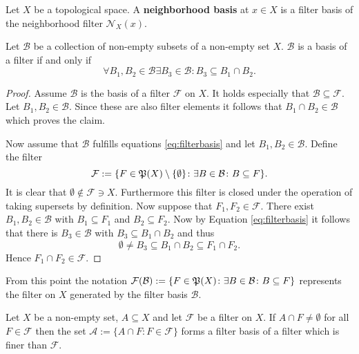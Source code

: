 \begin{defin}\label{defin:nbs}
  Let $X$ be a topological space. A \textbf{neighborhood basis} at $x \in X$ is a filter basis of the neighborhood filter $\mathcal{N}_X(x)$.
\end{defin}
  
\begin{lemma}\label{lem:filbas}
  Let $\mathcal{B}$ be a collection of non-empty subsets of a non-empty set $X$. $\mathcal{B}$ is a basis of a filter if and only if
  \begin{equation}\label{eq:filterbasis}
    \forall B_1, B_2 \in \mathcal{B}\exists B_3 \in \mathcal{B}: B_3 \subseteq B_1 \cap B_2.
  \end{equation}
\end{lemma}

\begin{proof}
  Assume $\mathcal{B}$ is the basis of a filter $\mathcal{F}$ on $X$. It holds especially that $\mathcal{B} \subseteq \mathcal{F}$. Let $B_1, B_2 \in \mathcal{B}$. Since these are also filter elements it follows that $B_1 \cap B_2 \in \mathcal{B}$ which proves the claim.

  Now assume that $\mathcal{B}$ fulfills equations \ref{eq:filterbasis} and let $B_1, B_2 \in \mathcal{B}$. Define the filter \[\mathcal{F} := \{ F \in \mathfrak{P}(X)\setminus\{ \emptyset \}\colon \exists B\in\mathcal{B}\colon B \subseteq F \}.\] It is clear that $\emptyset \notin \mathcal{F} \ni X$. Furthermore this filter is closed under the operation of taking supersets by definition. Now suppose that $F_1, F_2 \in \mathcal{F}$. There exist $B_1, B_2 \in \mathcal{B}$ with $B_1 \subseteq F_1$ and $B_2 \subseteq F_2$. Now by Equation \ref{eq:filterbasis} it follows that there is $B_3 \in \mathcal{B}$ with $B_3 \subseteq B_1 \cap B_2$ and thus
  \begin{equation*}
    \emptyset \neq B_3 \subseteq B_1 \cap B_2 \subseteq F_1 \cap F_2.
  \end{equation*}
  Hence $F_1 \cap F_2 \in \mathcal{F}$.
\end{proof}

From this point the notation $\mathcal{F}(\mathcal{B}) := \{F \in \mathfrak{P}(X) \colon \exists B\in\mathcal{B}\colon B\subseteq F\}$ represents the filter on $X$ generated by the filter basis $\mathcal{B}$.

\begin{col}\label{cor:filbas}
  Let $X$ be a non-empty set, $A \subseteq X$ and let $\mathcal{F}$ be a filter on $X$. If $A \cap F \neq \emptyset$ for all $F\in\mathcal{F}$ then the set $\mathcal{A} := \{A \cap F\colon F\in \mathcal{F}\}$ forms a filter basis of a filter which is finer than $\mathcal{F}$.
\end{col}

